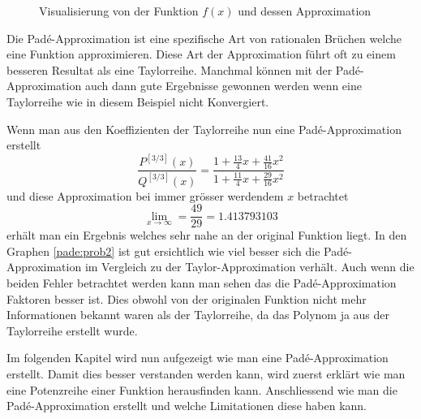 \begin{figure}[ht]
	\centering
	\caption{Visualisierung von der Funktion $f(x)$ und dessen Approximation\label{pade:prob}}
\end{figure}
Die Padé-Approximation ist eine spezifische Art von rationalen Brüchen welche eine Funktion approximieren.
Diese Art der Approximation führt oft zu einem besseren Resultat als eine Taylorreihe. 
Manchmal können mit der Padé-Approximation auch dann gute Ergebnisse gewonnen werden wenn eine Taylorreihe wie in diesem Beispiel nicht Konvergiert. 

Wenn man aus den Koeffizienten der Taylorreihe nun eine Padé-Approximation erstellt 
\begin{equation*}
\frac{P^{[3/3]}(x)}{Q^{[3/3]}(x)}
=
\frac{1+\frac{13}{4}x+\frac{41}{16}x^2}{1 + \frac{11}{4}x + \frac{29}{16}x^2} 
\end{equation*}
und diese Approximation bei immer grösser werdendem $x$ betrachtet
\begin{equation*}
\lim_{x \to \infty}
=
\frac{49}{29} = 1.413793103
\end{equation*}
erhält man ein Ergebnis welches sehr nahe an der original Funktion liegt. 
In den Graphen \ref{pade:prob2} ist gut ersichtlich wie viel besser sich die Padé-Approximation im Vergleich zu der Taylor-Approximation verhält.
Auch wenn die beiden Fehler betrachtet werden kann man sehen das die Padé-Approximation Faktoren besser ist.
Dies obwohl von der originalen Funktion nicht mehr Informationen bekannt waren als der Taylorreihe, da das Polynom ja aus der Taylorreihe erstellt wurde.

Im folgenden Kapitel wird nun aufgezeigt wie man eine Padé-Approximation erstellt.
Damit dies besser verstanden werden kann, wird zuerst erklärt wie man eine Potenzreihe einer Funktion herausfinden kann.
Anschliessend wie man die Padé-Approximation erstellt und welche Limitationen diese haben kann.



 


